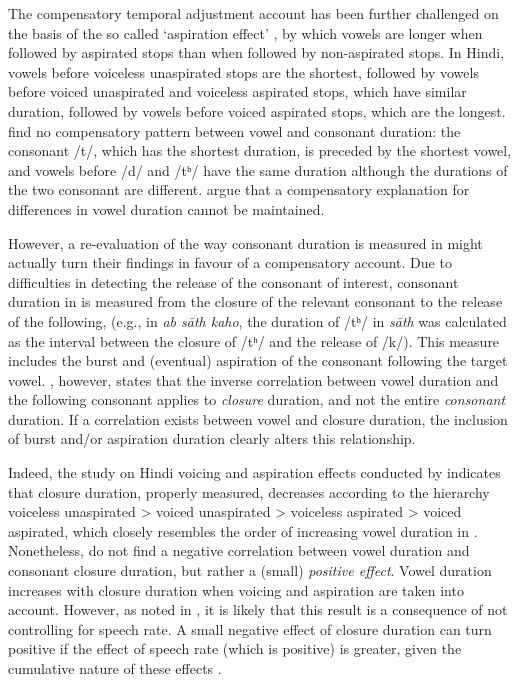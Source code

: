 \documentclass[preprint]{JASAnew}
\begin{document}
The compensatory temporal adjustment account has been further challenged
on the basis of the so called `aspiration effect' \citep{maddieson1976},
by which vowels are longer when followed by aspirated stops than when
followed by non-aspirated stops. In Hindi, vowels before voiceless
unaspirated stops are the shortest, followed by vowels before voiced
unaspirated and voiceless aspirated stops, which have similar duration,
followed by vowels before voiced aspirated stops, which are the longest.
\citet{maddieson1976} find no compensatory pattern between vowel and
consonant duration: the consonant /t/, which has the shortest duration,
is preceded by the shortest vowel, and vowels before /d/ and /tʰ/ have
the same duration although the durations of the two consonant are
different. \citet{maddieson1976} argue that a compensatory explanation
for differences in vowel duration cannot be maintained.

However, a re-evaluation of the way consonant duration is measured in
\citet{maddieson1976} might actually turn their findings in favour of a
compensatory account. Due to difficulties in detecting the release of
the consonant of interest, consonant duration in \citet{maddieson1976}
is measured from the closure of the relevant consonant to the release of
the following, (e.g., in \emph{ab sāth kaho}, the duration of /tʰ/ in
\emph{sāth} was calculated as the interval between the closure of /tʰ/
and the release of /k/). This measure includes the burst and (eventual)
aspiration of the consonant following the target vowel.
\citet{slis1969a}, however, states that the inverse correlation between
vowel duration and the following consonant applies to \emph{closure}
duration, and not the entire \emph{consonant} duration. If a correlation
exists between vowel and closure duration, the inclusion of burst and/or
aspiration duration clearly alters this relationship.

Indeed, the study on Hindi voicing and aspiration effects conducted by
\citet{durvasula2012} indicates that closure duration, properly
measured, decreases according to the hierarchy voiceless unaspirated
\textgreater{} voiced unaspirated \textgreater{} voiceless aspirated
\textgreater{} voiced aspirated, which closely resembles the order of
increasing vowel duration in \citet{maddieson1976}. Nonetheless,
\citet{durvasula2012} do not find a negative correlation between vowel
duration and consonant closure duration, but rather a (small)
\emph{positive effect}. Vowel duration increases with closure duration
when voicing and aspiration are taken into account. However, as noted in
\citet{begus2017}, it is likely that this result is a consequence of not
controlling for speech rate. A small negative effect of closure duration
can turn positive if the effect of speech rate (which is positive) is
greater, given the cumulative nature of these effects
\citep[p. 2177]{begus2017}.
\end{document}
